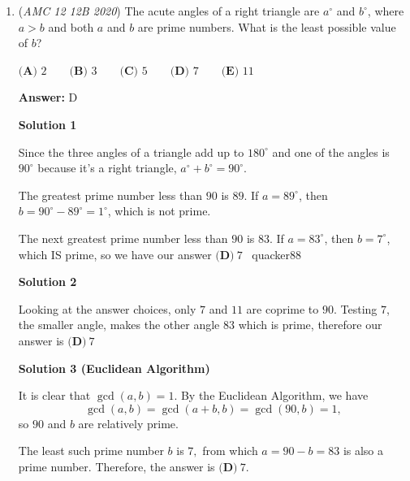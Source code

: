 \begin{enumerate}
 



\textbf{Solution 5}

We have $\frac{w}{x}=\frac{4}{3}, \frac{y}{z}=\frac{3}{2}, \frac{z}{x}=\frac{1}{6}.$ Find LCD: $\frac{w}{x}=\frac{8}{6}, \frac{z}{x}=\frac{1}{6}$, we have $\frac{w}{z}=\frac{8}{1}.$ Similarly, $\frac{w}{z}=\frac{16}{2}, \frac{y}{z}=\frac{3}{2},$ so $\frac{w}{y}=\frac{16}{3},$ $\boxed{\textbf{(E)}\ 16:3}$.

 


 


	\item (\textit{AMC 12 12B 2020}) The acute angles of a right triangle are $a^{\circ}$ and $b^{\circ}$, where $a>b$ and both $a$ and $b$ are prime numbers. What is the least possible value of $b$?


 $\textbf{(A) }2\qquad\textbf{(B) }3\qquad\textbf{(C) }5\qquad\textbf{(D) }7\qquad\textbf{(E) }11$

 \textbf{Answer: }D



\textbf{Solution 1}

Since the three angles of a triangle add up to $180^{\circ}$ and one of the angles is $90^{\circ}$ because it's a right triangle, $a^{\circ} + b^{\circ} = 90^{\circ}$.

 The greatest prime number less than $90$ is $89$. If $a=89^{\circ}$, then $b=90^{\circ}-89^{\circ}=1^{\circ}$, which is not prime.

 The next greatest prime number less than $90$ is $83$. If $a=83^{\circ}$, then $b=7^{\circ}$, which IS prime, so we have our answer $\boxed{\textbf{(D)}\ 7}$ ~quacker88

 



\textbf{Solution 2}

Looking at the answer choices, only $7$ and $11$ are coprime to $90$. Testing $7$, the smaller angle, makes the other angle $83$ which is prime, therefore our answer is $\boxed{\textbf{(D)}\ 7}$




\textbf{Solution 3 (Euclidean Algorithm)}

It is clear that $\gcd(a,b)=1.$ By the Euclidean Algorithm, we have 
 \[\gcd(a,b)=\gcd(a+b,b)=\gcd(90,b)=1,\] so $90$ and $b$ are relatively prime.

 The least such prime number $b$ is $7,$ from which $a=90-b=83$ is also a prime number. Therefore, the answer is $\boxed{\textbf{(D)}\ 7}.$




\end{enumerate}
